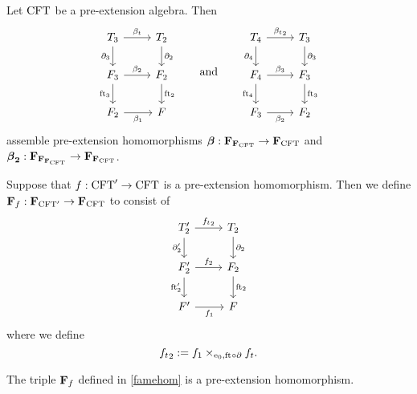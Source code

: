 \begin{defn}
Let $\mathrm{CFT}$ be a pre-extension algebra. Then
\begin{equation*}
\begin{tikzcd}
\stesyst_3
  \ar{r}{\beta_t}
  \ar{d}[swap]{\ebd[3]}
  &
\stesyst_2
  \ar{d}{\ebd[2]}
  \\
\stesysf_3
  \ar{r}{\beta_2}
  \ar{d}[swap]{\eft[3]}
  &
\stesysf_2
  \ar{d}{\eft[2]}
  \\
\stesysf_2
  \ar{r}[swap]{\beta_1}
  &
\stesysf
\end{tikzcd}
\qquad
\text{and}
\qquad
\begin{tikzcd}
\stesyst_4
  \ar{r}{{\beta_t}_2}
  \ar{d}[swap]{\ebd[4]}
  &
\stesyst_3
  \ar{d}{\ebd[3]}
  \\
\stesysf_4
  \ar{r}{\beta_3}
  \ar{d}[swap]{\eft[4]}
  &
\stesysf_3
  \ar{d}{\eft[3]}
  \\
\stesysf_3
  \ar{r}[swap]{\beta_2}
  &
\stesysf_2
\end{tikzcd}
\end{equation*}
assemble pre-extension homomorphisms 
\(
\boldsymbol{\beta}
  :
\mathbf{F}_{\mathbf{F}_{\mathrm{CFT}}}
  \to
\mathbf{F}_{\mathrm{CFT}}
\) 
and
\(
\boldsymbol{\beta}_\mathbf{2}
  :
\mathbf{F}_{\mathbf{F}_{\mathbf{F}_{\mathrm{CFT}}}}
  \to
\mathbf{F}_{\mathbf{F}_{\mathrm{CFT}}}
\).
\end{defn}

\begin{defn}\label{famehom}
Suppose that $f:\mathrm{CFT}'\to\mathrm{CFT}$ is a pre-extension homomorphism. Then we
define $\mathbf{F}_{f}:\mathbf{F}_{\mathrm{CFT}'}\to\mathbf{F}_{\mathrm{CFT}}$ to consist of
\begin{equation*}
\begin{tikzcd}
\stesyst_2'
  \ar{r}{{f_t}_2}
  \ar{d}[swap]{\ebd[2]'}
  &
\stesyst_2
  \ar{d}{\ebd[2]}
  \\
\stesysf_2'
  \ar{r}{f_2}
  \ar{d}[swap]{\eft[2]'}
  &
\stesysf_2
  \ar{d}{\eft[2]}
  \\
\stesysf'
  \ar{r}[swap]{f_1}
  &
\stesysf
\end{tikzcd}
\end{equation*}
where we define
\begin{equation*}
{f_t}_2 := \pullback{f_1}{f_t}{\ectxext}{\eft\circ\ebd}.
\end{equation*}
\end{defn}

\begin{lem}
The triple $\mathbf{F}_{f}$ defined in \autoref{famehom} is a pre-extension homomorphism.
\end{lem}

